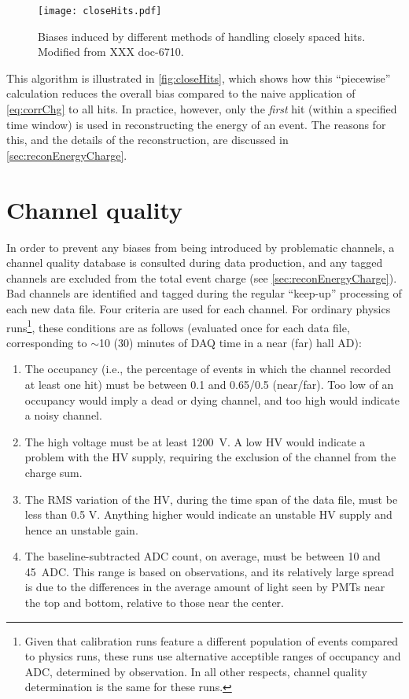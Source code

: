 \documentclass[../thesis.tex]{subfiles}
\begin{document}
\begin{figure}[ht]
  \texttt{[image: closeHits.pdf]}
  \caption{Biases induced by different methods of handling closely spaced
    hits. Modified from XXX doc-6710.}
  \label{fig:closeHits}
\end{figure}

This algorithm is illustrated in \autoref{fig:closeHits}, which shows how this
``piecewise'' calculation reduces the overall bias compared to the naive
application of \eqref{eq:corrChg} to all hits. In practice, however, only the
\emph{first} hit (within a specified time window) is used in reconstructing the
energy of an event. The reasons for this, and the details of the reconstruction,
are discussed in \autoref{sec:reconEnergyCharge}.

\section{Channel quality}
\label{sec:calibCQ}

In order to prevent any biases from being introduced by problematic channels, a
channel quality database is consulted during data production, and any tagged
channels are excluded from the total event charge (see
\autoref{sec:reconEnergyCharge}). Bad channels are identified and tagged during
the regular ``keep-up'' processing of each new data file. Four criteria are used
for each channel. For ordinary physics runs\footnote{Given that calibration runs
  feature a different population of events compared to physics runs, these runs
  use alternative acceptible ranges of occupancy and ADC, determined by
  observation. In all other respects, channel quality determination is the same
  for these runs.}, these conditions are as follows (evaluated once for each
data file, corresponding to $\sim$10 (30) minutes of DAQ time in a near (far)
hall AD):

\begin{enumerate}
\item The occupancy (i.e., the percentage of events in which the channel
  recorded at least one hit) must be between 0.1 and 0.65/0.5 (near/far). Too
  low of an occupancy would imply a dead or dying channel, and too high would
  indicate a noisy channel.
\item The high voltage must be at least 1200~V. A low HV would indicate a
  problem with the HV supply, requiring the exclusion of the channel from the
  charge sum.
\item The RMS variation of the HV, during the time span of the data file, must
  be less than 0.5 V. Anything higher would indicate an unstable HV supply and
  hence an unstable gain.
\item The baseline-subtracted ADC count, on average, must be between 10 and
  45~ADC. This range is based on observations, and its relatively large spread
  is due to the differences in the average amount of light seen by PMTs near the
  top and bottom, relative to those near the center.
\end{enumerate}
\end{document}
